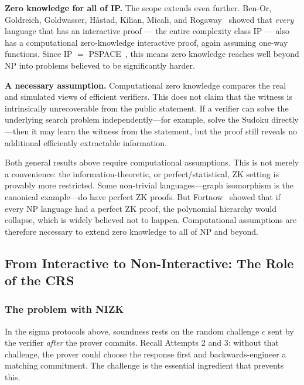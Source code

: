 \textbf{Zero knowledge for all of IP.}
The scope extends even further. Ben-Or, Goldreich, Goldwasser, H\aa stad, Kilian, Micali, and Rogaway~\cite{BGGHKMR88} showed that \emph{every} language that has an interactive proof --- the entire complexity class IP --- also has a computational zero-knowledge interactive proof, again assuming one-way functions. Since IP $=$ PSPACE~\cite{Shamir90}, this means zero knowledge reaches well beyond NP into problems believed to be significantly harder.

\textbf{A necessary assumption.}
Computational zero knowledge compares the real and simulated views of efficient verifiers.
This does not claim that the witness is intrinsically unrecoverable from the public statement.
If a verifier can solve the underlying search problem independently---for example, solve the
Sudoku directly---then it may learn the witness from the statement, but the proof still reveals
no additional efficiently extractable information.

Both general results above require computational assumptions. This is not merely a
convenience: the information-theoretic, or perfect/statistical, ZK setting is provably more
restricted. Some non-trivial languages---graph isomorphism is the canonical example---do have
perfect ZK proofs. But Fortnow~\cite{Fortnow87} showed that if every NP language had a perfect
ZK proof, the polynomial hierarchy would collapse, which is widely believed not to happen.
Computational assumptions are therefore necessary to extend zero knowledge to all of NP and
beyond.

\subsection{From Interactive to Non-Interactive: The Role of the CRS}

\subsubsection{The problem with NIZK}

In the sigma protocols above, soundness rests on the random challenge $c$ sent by the verifier \emph{after} the prover commits. Recall Attempts 2 and 3: without that challenge, the prover could choose the response first and backwards-engineer a matching commitment. The challenge is the essential ingredient that prevents this.

